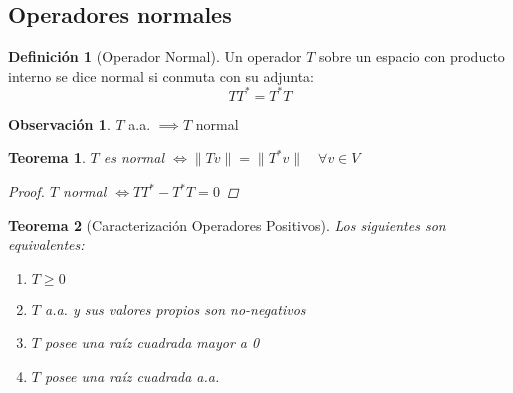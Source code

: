 \documentclass[11pt]{book}
\newtheorem{thm}{Teorema}[section]
\theoremstyle{definition}
\newtheorem{defn}{Definición}[section]
\newtheorem{obs}{Observación}[section]
\begin{document}
\subsection{Operadores normales}
\begin{defn}[Operador Normal]
	Un operador $T$ sobre un espacio con producto interno se dice normal si conmuta con su adjunta:
	\[TT^*=T^*T\]
\end{defn}
\begin{obs}
	$T$ a.a. $\implies T$ normal
\end{obs}
\begin{thm}
	$T$ es normal $\iff\|Tv\|=\|T^*v\|\quad \forall v\in V$
	\begin{proof}
		$T$ normal $\iff TT^*-T^*T=0$
	\end{proof} 
\end{thm}
\begin{thm}[Caracterización Operadores Positivos]
	Los siguientes son equivalentes:
	\begin{enumerate}[label=\alph*)]
		\item $T\geq 0$

		\item $T$ a.a. y sus valores propios son no-negativos

		\item $T$ posee una raíz cuadrada mayor a 0

		\item $T$ posee una raíz cuadrada a.a.


\end{enumerate}
\end{thm}
\end{document}
